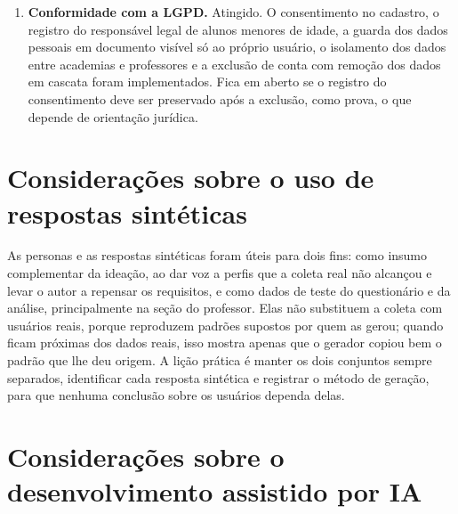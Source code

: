 \begin{enumerate}
        com três perfis de usuário. Os 33 requisitos funcionais foram
        implementados; a interface foi conferida na versão web, e a data
        de conquista das medalhas, o público-alvo e a vigência das
        missões, a personalização das faixas e o envio de notificações
        foram verificados em um iPhone. As regras de negócio que protegem
        a gamificação, como a validação humana antes do crédito de pontos,
        foram implementadas nas regras de segurança do banco de dados e
        cobertas por 288 testes automatizados. A maior parte do código foi
        escrita por um agente de IA, a partir de requisitos, roteiros e
        planos do autor, que concentrou o seu trabalho no planejamento, no
        projeto e no controle de qualidade.
  \item \textbf{Conformidade com a LGPD.} Atingido. O consentimento no
        cadastro, o registro do responsável legal de alunos menores de
        idade, a guarda dos dados pessoais em documento visível só ao
        próprio usuário, o isolamento dos dados entre academias e professores e a
        exclusão de conta com remoção dos dados em cascata foram
        implementados. Fica em aberto se o registro do consentimento deve
        ser preservado após a exclusão, como prova, o que depende de
        orientação jurídica.
\end{enumerate}

\section{Considerações sobre o uso de respostas sintéticas}

As personas e as respostas sintéticas foram úteis para dois fins: como
insumo complementar da ideação, ao dar voz a perfis que a coleta real não
alcançou e levar o autor a repensar os requisitos, e como dados de teste
do questionário e da análise, principalmente na seção do professor. Elas não substituem a coleta com
usuários reais, porque reproduzem padrões supostos por quem as gerou;
quando ficam próximas dos dados reais, isso mostra apenas que o gerador
copiou bem o padrão que lhe deu origem. A lição prática é manter os dois
conjuntos sempre separados, identificar cada resposta sintética e
registrar o método de geração, para que nenhuma conclusão sobre os
usuários dependa delas.

\section{Considerações sobre o desenvolvimento assistido por IA}

